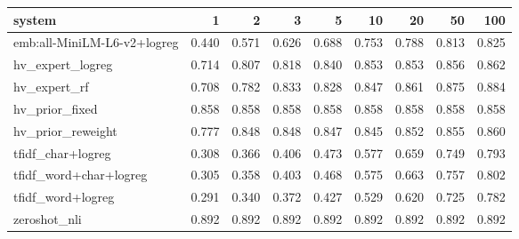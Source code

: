 \begin{tabular}{lrrrrrrrr}
\toprule
system & 1 & 2 & 3 & 5 & 10 & 20 & 50 & 100 \\
\midrule
emb:all-MiniLM-L6-v2+logreg & 0.440 & 0.571 & 0.626 & 0.688 & 0.753 & 0.788 & 0.813 & 0.825 \\
hv\_expert\_logreg & 0.714 & 0.807 & 0.818 & 0.840 & 0.853 & 0.853 & 0.856 & 0.862 \\
hv\_expert\_rf & 0.708 & 0.782 & 0.833 & 0.828 & 0.847 & 0.861 & 0.875 & 0.884 \\
hv\_prior\_fixed & 0.858 & 0.858 & 0.858 & 0.858 & 0.858 & 0.858 & 0.858 & 0.858 \\
hv\_prior\_reweight & 0.777 & 0.848 & 0.848 & 0.847 & 0.845 & 0.852 & 0.855 & 0.860 \\
tfidf\_char+logreg & 0.308 & 0.366 & 0.406 & 0.473 & 0.577 & 0.659 & 0.749 & 0.793 \\
tfidf\_word+char+logreg & 0.305 & 0.358 & 0.403 & 0.468 & 0.575 & 0.663 & 0.757 & 0.802 \\
tfidf\_word+logreg & 0.291 & 0.340 & 0.372 & 0.427 & 0.529 & 0.620 & 0.725 & 0.782 \\
zeroshot\_nli & 0.892 & 0.892 & 0.892 & 0.892 & 0.892 & 0.892 & 0.892 & 0.892 \\
\bottomrule
\end{tabular}
